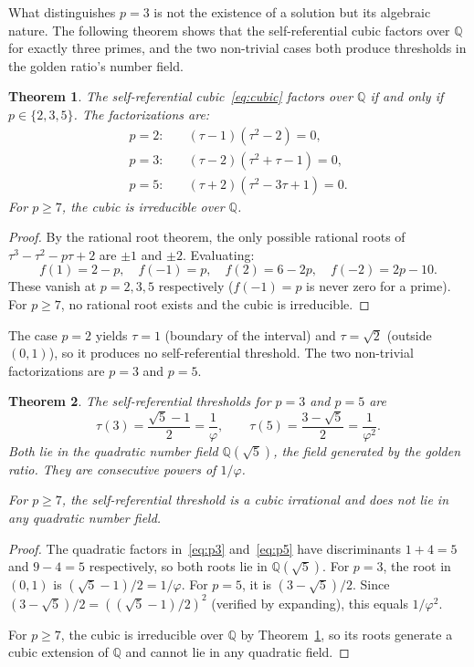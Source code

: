 \documentclass[12pt]{amsart}
\newtheorem{theorem}{Theorem}
\theoremstyle{definition}
\theoremstyle{remark}
\begin{document}
What distinguishes $p = 3$ is not the existence of a solution but
its algebraic nature. The following theorem shows that the
self-referential cubic factors over $\mathbb{Q}$ for exactly three
primes, and the two non-trivial cases both produce thresholds in the
golden ratio's number field.

\begin{theorem}\label{thm:cubic-factors}
The self-referential cubic~\eqref{eq:cubic} factors over
$\mathbb{Q}$ if and only if $p \in \{2, 3, 5\}$. The factorizations
are:
\begin{align}
p = 2: \quad & (\tau - 1)(\tau^{2} - 2) = 0, \label{eq:p2} \\
p = 3: \quad & (\tau - 2)(\tau^{2} + \tau - 1) = 0, \label{eq:p3} \\
p = 5: \quad & (\tau + 2)(\tau^{2} - 3\tau + 1) = 0. \label{eq:p5}
\end{align}
For $p \ge 7$, the cubic is irreducible over $\mathbb{Q}$.
\end{theorem}

\begin{proof}
By the rational root theorem, the only possible rational roots of
$\tau^{3} - \tau^{2} - p\tau + 2$ are $\pm 1$ and $\pm 2$.
Evaluating:
\[
f(1) = 2 - p, \quad f(-1) = p, \quad f(2) = 6 - 2p, \quad
f(-2) = 2p - 10.
\]
These vanish at $p = 2, 3, 5$ respectively ($f(-1) = p$ is never
zero for a prime). For $p \ge 7$, no rational root exists and the
cubic is irreducible.
\end{proof}

The case $p = 2$ yields $\tau = 1$ (boundary of the interval) and
$\tau = \sqrt{2}$ (outside $(0,1)$), so it produces no
self-referential threshold. The two non-trivial factorizations are
$p = 3$ and $p = 5$.

\begin{theorem}\label{thm:golden-field}
The self-referential thresholds for $p = 3$ and $p = 5$ are
\[
\tau(3) = \frac{\sqrt{5}-1}{2} = \frac{1}{\varphi},
\qquad
\tau(5) = \frac{3 - \sqrt{5}}{2} = \frac{1}{\varphi^{2}}.
\]
Both lie in the quadratic number field
$\mathbb{Q}(\sqrt{5})$, the field generated by the golden ratio.
They are consecutive powers of $1/\varphi$.

For $p \ge 7$, the self-referential threshold is a cubic irrational
and does not lie in any quadratic number field.
\end{theorem}

\begin{proof}
The quadratic factors in~\eqref{eq:p3} and~\eqref{eq:p5} have
discriminants $1 + 4 = 5$ and $9 - 4 = 5$ respectively, so both
roots lie in $\mathbb{Q}(\sqrt{5})$. For $p = 3$, the root in
$(0,1)$ is $(\sqrt{5}-1)/2 = 1/\varphi$. For $p = 5$, it is
$(3-\sqrt{5})/2$. Since $(3-\sqrt{5})/2 = ((\sqrt{5}-1)/2)^{2}$
(verified by expanding), this equals $1/\varphi^{2}$.

For $p \ge 7$, the cubic is irreducible over $\mathbb{Q}$ by
Theorem~\ref{thm:cubic-factors}, so its roots generate a cubic
extension of $\mathbb{Q}$ and cannot lie in any quadratic field.
\end{proof}
\end{document}
